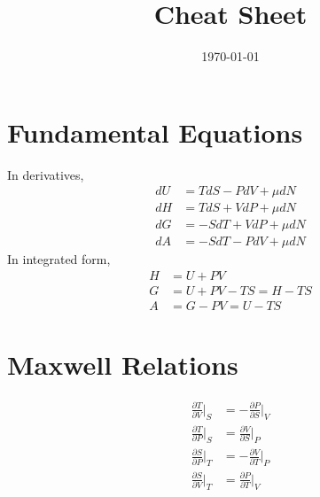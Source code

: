 \documentclass[a4paper,11pt]{article}
\title{Cheat Sheet}
\subtitle{}
\date{\today}
\begin{document}
\let\endtitlepage\relax
\setlength{\parindent}{0pt}

\maketitle\thispagestyle{fancy}

\begin{multicols}{2}
\section{Fundamental Equations}
In derivatives,
\begin{subequations}\label{eq:fund_eq}
\begin{align}
	dU &= TdS - PdV + \mu dN\\
	dH &= TdS + VdP + \mu dN\\ 
	dG &= -SdT + VdP + \mu dN\\ 
	dA &= -SdT - PdV + \mu dN
\end{align}
\end{subequations}
In integrated form,
\begin{subequations}\label{eq:fund_eq_int}
	\begin{align}
		H &= U + PV\\
		G &= U + PV - TS = H - TS\\
		A &= G - PV = U - TS
	\end{align}
\end{subequations}

\section{Maxwell Relations}
\begin{subequations}\label{eq:maxwell}
	\begin{align}
		\frac{\partial T}{\partial V}\bigg|_S &= -\frac{\partial P}{\partial S}\bigg|_V\\
		\frac{\partial T}{\partial P}\bigg|_S &= \frac{\partial V}{\partial S}\bigg|_P\\
		\frac{\partial S}{\partial P}\bigg|_T &= -\frac{\partial V}{\partial T}\bigg|_P\\
		\frac{\partial S}{\partial V}\bigg|_T &= \frac{\partial P}{\partial T}\bigg|_V
	\end{align}
\end{subequations}


\end{multicols}
\end{document}
